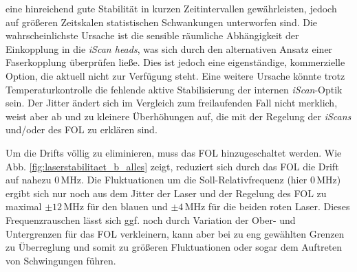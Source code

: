 eine hinreichend gute Stabilität in kurzen Zeitintervallen gewährleisten, jedoch
auf größeren Zeitskalen statistischen Schwankungen unterworfen sind. Die
wahrscheinlichste Ursache ist die sensible räumliche Abhängigkeit der
Einkopplung in die \textit{iScan heads}, was sich durch den alternativen Ansatz
einer Faserkopplung überprüfen ließe. Dies ist jedoch eine eigenständige,
kommerzielle Option, die aktuell nicht zur Verfügung steht. Eine weitere Ursache
könnte trotz Temperaturkontrolle die fehlende aktive Stabilisierung der internen \textit{iScan}-Optik sein. Der Jitter ändert sich im Vergleich zum freilaufenden Fall nicht merklich,
weist aber ab und zu kleinere Überhöhungen auf, die mit der Regelung der
\textit{iScans} und/oder des FOL zu erklären sind.\par
Um die Drifts völlig zu eliminieren, muss das FOL hinzugeschaltet werden. Wie
Abb. \ref{fig:laserstabilitaet_b_alles} zeigt, reduziert sich
durch das FOL die Drift auf nahezu $0\,$MHz. Die Fluktuationen um die
Soll-Relativfrequenz (hier $0\,$MHz) ergibt sich nur noch aus dem Jitter der
Laser und der Regelung des FOL zu maximal $\pm12\,$MHz für den blauen und
$\pm4\,$MHz für die beiden roten Laser. Dieses Frequenzrauschen lässt sich ggf.
noch durch Variation der Ober- und Untergrenzen für das FOL verkleinern, kann
aber bei zu eng gewählten Grenzen zu Überreglung und somit zu größeren
Fluktuationen oder sogar dem Auftreten von Schwingungen führen.
